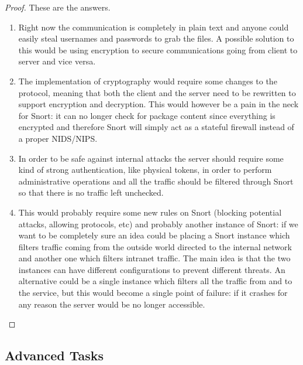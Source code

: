 \documentclass[a4paper,11pt,hidelinks]{article}
\begin{document}
\begin{proof}
    These are the answers.
    \begin{enumerate}
        \item Right now the communication is completely in plain text and anyone could easily steal usernames and passwords to grab the files. A possible solution to this would be using encryption to secure communications going from client to server and vice versa.
        \item The implementation of cryptography would require some changes to the protocol, meaning that both the client and the server need to be rewritten to support encryption and decryption. This would however be a pain in the neck for Snort: it can no longer check for package content since everything is encrypted and therefore Snort will simply act as a stateful firewall instead of a proper NIDS/NIPS.
        \item In order to be safe against internal attacks the server should require some kind of strong authentication, like physical tokens, in order to perform administrative operations and all the traffic should be filtered through Snort so that there is no traffic left unchecked.
        \item This would probably require some new rules on Snort (blocking potential attacks, allowing protocols, etc) and probably another instance of Snort: if we want to be completely sure an idea could be placing a Snort instance which filters traffic coming from the outside world directed to the internal network and another one which filters intranet traffic. The main idea is that the two instances can have different configurations to prevent different threats. An alternative could be a single instance which filters all the traffic from and to the service, but this would become a single point of failure: if it crashes for any reason the server would be no longer accessible.
    \end{enumerate}
\end{proof}

\clearpage
\newpage

\subsection{Advanced Tasks}
\end{document}
